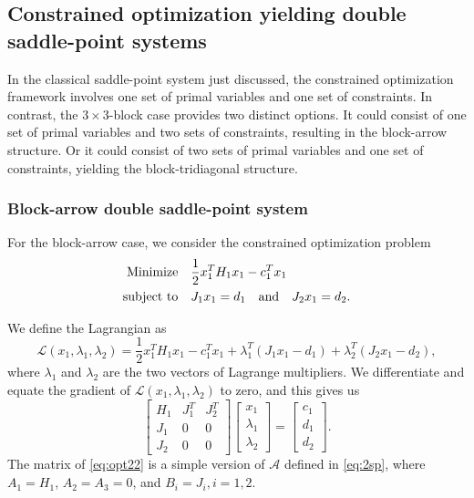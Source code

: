 \documentclass{article}
\begin{document}
\subsection{Constrained optimization yielding double saddle-point systems}
In the classical saddle-point system just discussed, the constrained optimization framework involves one set of primal variables and one set of constraints. In contrast, the $3 \times 3$-block case provides two distinct options. It could consist of 
one set of primal variables and two sets of constraints, resulting in the block-arrow structure. Or it could consist of
two sets of primal variables and one set of constraints, yielding the block-tridiagonal structure.



\subsubsection*{Block-arrow double saddle-point system}
For the block-arrow case, we consider the constrained optimization problem
\begin{align*}
\text{Minimize} \quad & \frac{1}{2} x_1^T H_1 x_1  - c_1^T x_1  \\
\text{subject to} \quad & J_1 x_1 = d_1 {\quad \rm and\quad }J_2 x_1 = d_2.
\end{align*}

We define the Lagrangian as
$$ \mathcal{L}(x_1,\lambda_1, \lambda_2) = \frac{1}{2} x_1^T H_1 x_1    -c_1^T x_1  + \lambda_1^T (J_1x_1 -d_1)+ \lambda_2^T (J_2 x_1 -d_2),$$
where $\lambda_1$ and $\lambda_2$ are the two vectors of Lagrange multipliers.
We differentiate and equate the gradient of $\mathcal{L}(x_1,\lambda_1,\lambda_2)$ to zero, and this gives us
\begin{equation}
\label{eq:opt22}
\begin{bmatrix}
H_1 & J_1^T  & J_2^T  \\
J_1 & 0 & 0 \\
J_2 & 0 & 0
\end{bmatrix}\begin{bmatrix}
    x_1 \\
    \lambda_1 \\
    \lambda_2
\end{bmatrix} = \begin{bmatrix}
    c_1 \\
    d_1 \\
    d_2
\end{bmatrix}.
\end{equation}
The matrix of \eqref{eq:opt22}  is a simple version of $\mathcal{A}$ defined in \eqref{eq:2sp},  where $A_1=H_1$, $A_2=A_3=0$, and $B_i=J_i, i=1,2$.
\end{document}
